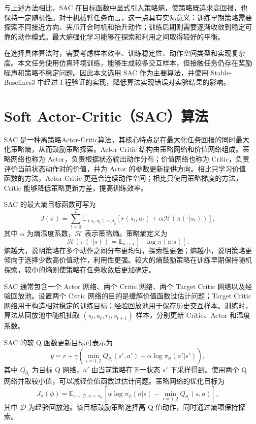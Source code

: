 \documentclass[
    type = bachelor,
    oneside,
    fontset = fandol
]{njuthesis}
\begin{document}
与上述方法相比，SAC 在目标函数中显式引入策略熵，使策略既追求高回报，也保持一定随机性。对于机械臂任务而言，这一点具有实际意义：训练早期策略需要探索不同接近方向、夹爪开合时机和抬升动作；训练后期则需要逐渐收敛到稳定可靠的动作模式。最大熵强化学习能够在探索和利用之间取得较好的平衡。

在选择具体算法时，需要考虑样本效率、训练稳定性、动作空间类型和实现复杂度。本文任务使用仿真环境训练，能够生成较多交互样本，但接触任务仍存在奖励噪声和策略不稳定问题。因此本文选用 SAC 作为主要算法，并使用 Stable-Baselines3 中经过工程验证的实现，降低算法实现错误对实验结果的影响。

\section{Soft Actor-Critic（SAC）算法}

SAC 是一种离策略Actor-Critic算法，其核心特点是在最大化任务回报的同时最大化策略熵，从而鼓励策略探索。Actor-Critic 结构由策略网络和价值网络组成。策略网络也称为 Actor，负责根据状态输出动作分布；价值网络也称为 Critic，负责评价当前状态动作对的价值，并为 Actor 的参数更新提供方向。相比只学习价值函数的方法，Actor-Critic 更适合连续动作空间；相比只使用策略梯度的方法，Critic 能够降低策略更新方差，提高训练效率。


SAC 的最大熵目标函数可写为
\begin{equation}
  J(\pi)=\sum_{t=0}^{T}\mathbb{E}_{(s_t,a_t)\sim\rho_{\pi}}
  \left[r(s_t,a_t)+\alpha\mathcal{H}(\pi(\cdot|s_t))\right],
\end{equation}
其中 $\alpha$ 为熵温度系数，$\mathcal{H}$ 表示策略熵。策略熵定义为
\begin{equation}
  \mathcal{H}(\pi(\cdot|s))=
  \mathbb{E}_{a\sim\pi}\left[-\log \pi(a|s)\right].
\end{equation}
熵越大，说明策略在多个动作之间分布更均匀，探索性更强；熵越小，说明策略更倾向于选择少数高价值动作，利用性更强。较大的熵鼓励策略在训练早期保持随机探索，较小的熵则使策略在任务收敛后更加确定。

SAC 通常包含一个 Actor 网络、两个 Critic 网络、两个 Target Critic 网络以及经验回放池。设置两个 Critic 网络的目的是缓解价值函数过估计问题；Target Critic 网络用于构造相对稳定的训练目标；经验回放池用于保存历史交互样本。训练时，算法从回放池中随机抽取 $(s_t,a_t,r_t,s_{t+1})$ 样本，分别更新 Critic、Actor 和温度系数。

SAC 的软 Q 函数更新目标可表示为
\begin{equation}
  y = r + \gamma \left( \min_{i=1,2} Q_{\bar{\theta}_i}(s',a')
  - \alpha \log \pi_{\phi}(a'|s') \right),
\end{equation}
其中 $Q_{\bar{\theta}_i}$ 为目标 Q 网络，$a'$ 由当前策略在下一状态 $s'$ 下采样得到。使用两个 Q 网络并取较小值，可以减轻价值函数过估计问题。策略网络的优化目标为
\begin{equation}
  J_{\pi}(\phi)=
  \mathbb{E}_{s\sim \mathcal{D}, a\sim\pi_{\phi}}
  \left[\alpha \log \pi_{\phi}(a|s)-\min_{i=1,2}Q_{\theta_i}(s,a)\right],
\end{equation}
其中 $\mathcal{D}$ 为经验回放池。该目标鼓励策略选择高 Q 值动作，同时通过熵项保持探索。
\end{document}

